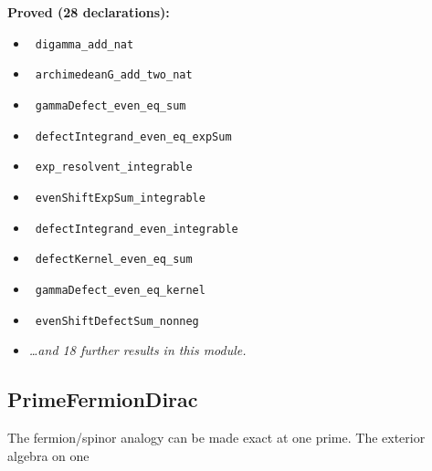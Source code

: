 \documentclass{report}
\theoremstyle{definition}
\begin{document}
\noindent\textbf{Proved (28 declarations):}
\begin{itemize}
  \item {}\leanok\ \texttt{digamma\_add\_nat}
  \item {}\leanok\ \texttt{archimedeanG\_add\_two\_nat}
  \item {}\leanok\ \texttt{gammaDefect\_even\_eq\_sum}
  \item {}\leanok\ \texttt{defectIntegrand\_even\_eq\_expSum}
  \item {}\leanok\ \texttt{exp\_resolvent\_integrable}
  \item {}\leanok\ \texttt{evenShiftExpSum\_integrable}
  \item {}\leanok\ \texttt{defectIntegrand\_even\_integrable}
  \item {}\leanok\ \texttt{defectKernel\_even\_eq\_sum}
  \item {}\leanok\ \texttt{gammaDefect\_even\_eq\_kernel}
  \item {}\leanok\ \texttt{evenShiftDefectSum\_nonneg}
  \item \emph{\ldots and 18 further results in this module.}
\end{itemize}

\subsection{PrimeFermionDirac}
The fermion/spinor analogy can be made exact at one prime.  The exterior algebra on one
\end{document}
